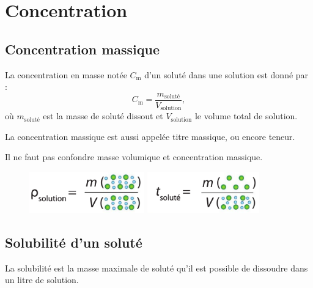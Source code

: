 \documentclass[12pt,a4paper]{article}
\begin{document}
\section{Concentration}

\subsection{Concentration massique}

\begin{definition}
La concentration en masse notée $C_\mathrm{m}$ d'un soluté dans une solution est donné par :
\begin{equation}
C_\mathrm{m} = \frac{m_\mathrm{soluté}}{V_\mathrm{solution}},
\nonumber
\end{equation}
où $m_\mathrm{soluté}$ est la masse de soluté dissout et $V_\mathrm{solution}$ le volume total de solution.
\end{definition}

\begin{remarque}
La concentration massique est aussi appelée titre massique, ou encore teneur.
\end{remarque}

\begin{remarque}
Il ne faut pas confondre masse volumique et concentration massique.
\end{remarque}

\begin{figure}[h]
\center
{
\hfill
\includegraphics[height=50pt]{../images/difference_rho_t_rho.png}
\hfill
\includegraphics[height=50pt]{../images/difference_rho_t_t.png}
\hfill
}
\end{figure}

\subsection{Solubilité d'un soluté}

\begin{definition}
La solubilité est la masse maximale de soluté qu'il est possible de dissoudre dans un litre de solution.
\end{definition}
\end{document}
